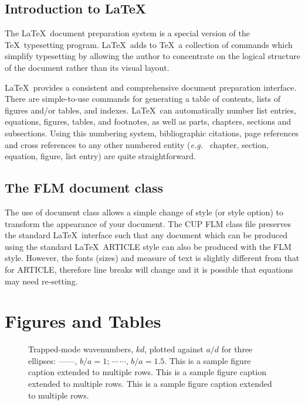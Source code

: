 \documentclass[lineno]{JFM-FLM_Au}
\begin{document}
\subsection{Introduction to LaTeX}

The LaTeX\ document preparation system is a special version of the
TeX\ typesetting program. LaTeX\ adds to TeX\ a collection of
commands which simplify typesetting by allowing the author to
concentrate on the logical structure of the document rather than
its visual layout.

LaTeX\ provides a consistent and comprehensive document preparation
interface. There are simple-to-use commands for generating a table of
contents, lists of figures and/or tables, and indexes. LaTeX\ can
automatically number list entries, equations, figures, tables, and
footnotes, as well as parts, chapters, sections and subsections.
Using this numbering system, bibliographic citations, page references
and cross references to any other numbered entity ({\it e.g.\ } chapter,
section, equation, figure, list entry) are quite straightforward.

\subsection{The FLM document class}

The use of document class allows a simple change of style (or style option)
to transform the appearance of your document. The CUP FLM class file preserves
the standard LaTeX\ interface such that any document which can be produced
using the standard LaTeX\ ARTICLE style can also be produced with the
FLM style. However, the fonts (sizes) and measure of text is slightly different
from that for ARTICLE, therefore line breaks will change and it is possible
that equations may need re-setting.



\section{Figures and Tables}\label{sec:Figures_Tables}

\begin{figure}
  \caption{Trapped-mode wavenumbers, $kd$, plotted against $a/d$ for
    three ellipses: %
    ---$\!$---,
    $b/a=1$; $\cdots$\,$\cdots$, $b/a=1.5$. This is a sample figure caption extended to multiple rows. This is a sample figure caption extended to multiple rows. This is a sample figure caption extended to multiple rows.}
\label{fig:ka}
\end{figure}
\end{document}

